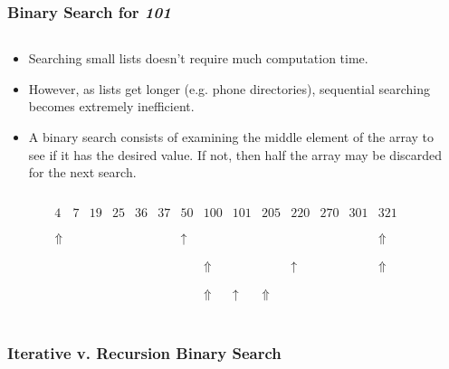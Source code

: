 
\begin{frame}[fragile]
\frametitle{Binary Search for {\em 101}}
\begin{columns}[T]

\begin{column}{0.525\textwidth}
\begin{itemize}[<+->]
\item Searching small lists doesn't require much computation time.
\item However, as lists get longer (e.g. phone directories), sequential searching becomes extremely inefficient.
\item A binary search consists of examining the middle element of the array to see if it has the desired value. If not, then half the array may be discarded for the next search.
\end{itemize}
\fontsize{5pt}{7.2}\selectfont
\[
\begin{array}{cccccccccccccc}
\\
\\
4 & 7 & 19 & 25 & 36 & 37 & 50 & 100 & 101 & 205 & 220 & 270 & 301 & 321 \\
\\
\\
\Uparrow & & & & & & \uparrow & & & & & & & \Uparrow \\
\\
\\
& & & & & & & \Uparrow & & & \uparrow & & & \Uparrow \\
\\
\\
& & & & & & & \Uparrow & \uparrow & \Uparrow & & & & \\
\end{array}
\]
\end{column}

\pause
\begin{column}{0.425\textwidth}

\end{column}

\end{columns}
\end{frame}


\begin{frame}[fragile]
\frametitle{Iterative v. Recursion Binary Search}
\begin{columns}[T]

\begin{column}{0.40\textwidth}

\end{column}

\pause
\begin{column}{0.40\textwidth}

\end{column}

\end{columns}
\end{frame}

